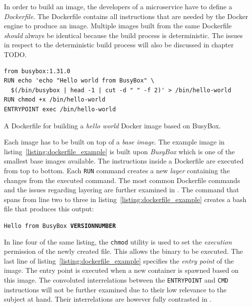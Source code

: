In order to build an image, the developers of a microservice have to define a
\textit{Dockerfile}. The Dockerfile contains all instructions that are needed
by the Docker engine to produce an image. Multiple images built from the same
Dockerfile \textit{should} always be identical because the build process is
deterministic. The issues in respect to the deterministic build process will
also be discussed in chapter  TODO.

\begin{listing}[H]
\begin{verbatim}
from busybox:1.31.0
RUN echo 'echo "Hello world from BusyBox" \
  $(/bin/busybox | head -1 | cut -d " " -f 2)' > /bin/hello-world
RUN chmod +x /bin/hello-world
ENTRYPOINT exec /bin/hello-world
\end{verbatim}
\caption{A Dockerfile for building a \textit{hello world} Docker image based on BusyBox.}
\label{listing:dockerfile_example}
\end{listing}

Each image has to be built on top of a \textit{base image}. The example image
in listing~\ref{listing:dockerfile_example} is built upon \textit{BusyBox}
which is one of the smallest base images available. %
The instructions inside a Dockerfile are executed from top to bottom. Each
\texttt{RUN} command creates a new \textit{layer} containing the changes from
the executed command. The most common Dockerfile commands and the issues
regarding layering are further examined in
\autocite{DockerBestpracticeswriting}. The command that spans from line two to
three in listing~\ref{listing:dockerfile_example} creates a bash file that
produces this output:

\hspace{1cm} \texttt{Hello from BusyBox \textbf{VERSION\textunderscore{}NUMBER}}

In line four of the same listing, the \texttt{chmod} utility is used to set the
\textit{execution} permission of the newly created file. This allows the binary
to be executed. The last line of listing~\ref{listing:dockerfile_example} specifies the
\textit{entry point} of the image. The entry point is executed when a new
container is spawned based on this image. The convoluted interrelations between
the \texttt{ENTRYPOINT} and \texttt{CMD} instructions will not be further
examined due to their low relevance to the subject at hand. Their
interrelations are however fully contrasted in
\autocite{DockerDockerfilereferenceEntrypoint}.


